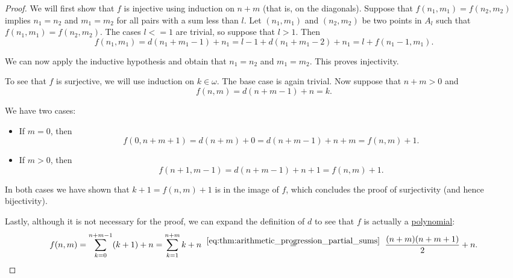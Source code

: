 \begin{proof}
  We will first show that \( f \) is injective using induction on \( n + m \) (that is, on the diagonals). Suppose that \( f(n_1, m_1) = f(n_2, m_2) \) implies \( n_1 = n_2 \) and \( m_1 = m_2 \) for all pairs with a sum less than \( l \). Let \( (n_1, m_1) \) and \( (n_2, m_2) \) be two points in \( A_l \) such that \( f(n_1, m_1) = f(n_2, m_2) \). The cases \( l <= 1 \) are trivial, so suppose that \( l > 1 \). Then
  \begin{equation*}
    f(n_1, m_1)
    =
    d(n_1 + m_1 - 1) + n_1
    =
    l - 1 + d(n_1 + m_1 - 2) + n_1
    =
    l + f(n_1 - 1, m_1).
  \end{equation*}

  We can now apply the inductive hypothesis and obtain that \( n_1 = n_2 \) and \( m_1 = m_2 \). This proves injectivity.

  To see that \( f \) is surjective, we will use induction on \( k \in \omega \). The base case is again trivial. Now suppose that \( n + m > 0 \) and
  \begin{equation*}
    f(n, m) = d(n + m - 1) + n = k.
  \end{equation*}

  We have two cases:
  \begin{itemize}
    \item If \( m = 0 \), then
    \begin{equation*}
      f(0, n + m + 1) = d(n + m) + 0 = d(n + m - 1) + n + m = f(n, m) + 1.
    \end{equation*}

    \item If \( m > 0 \), then
    \begin{equation*}
      f(n + 1, m - 1) = d(n + m - 1) + n + 1 = f(n, m) + 1.
    \end{equation*}
  \end{itemize}

  In both cases we have shown that \( k + 1 = f(n, m) + 1 \) is in the image of \( f \), which concludes the proof of surjectivity (and hence bijectivity).

  Lastly, although it is not necessary for the proof, we can expand the definition of \( d \) to see that \( f \) is actually a \hyperref[def:polynomial_algebra]{polynomial}:
  \begin{equation*}
    f(n, m)
    =
    \sum_{k=0}^{n + m - 1} (k + 1) + n
    =
    \sum_{k=1}^{n + m} k + n
    \reloset {\eqref{eq:thm:arithmetic_progression_partial_sums}} =
    \frac {(n + m) (n + m + 1)} 2 + n.
  \end{equation*}


\end{proof}
